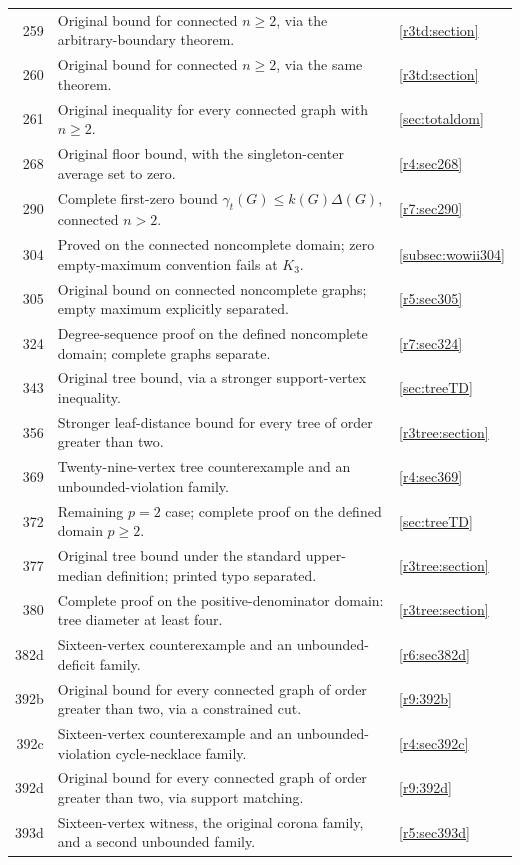 \documentclass[11pt,a4paper]{article}
\theoremstyle{remark}
\begin{document}
\begin{longtable}{@{}r p{10.5cm} l@{}}
259 & Original bound for connected $n\ge2$, via the arbitrary-boundary theorem. & \ref{r3td:section}\\
260 & Original bound for connected $n\ge2$, via the same theorem. & \ref{r3td:section}\\
261 & Original inequality for every connected graph with $n\ge2$. & \ref{sec:totaldom}\\
268 & Original floor bound, with the singleton-center average set to zero. & \ref{r4:sec268}\\
290 & Complete first-zero bound $\gamma_t(G)\le k(G)\Delta(G)$, connected $n>2$. & \ref{r7:sec290}\\
304 & Proved on the connected noncomplete domain; zero empty-maximum convention fails at $K_3$. & \ref{subsec:wowii304}\\
305 & Original bound on connected noncomplete graphs; empty maximum explicitly separated. & \ref{r5:sec305}\\
324 & Degree-sequence proof on the defined noncomplete domain; complete graphs separate. & \ref{r7:sec324}\\
343 & Original tree bound, via a stronger support-vertex inequality. & \ref{sec:treeTD}\\
356 & Stronger leaf-distance bound for every tree of order greater than two. & \ref{r3tree:section}\\
369 & Twenty-nine-vertex tree counterexample and an unbounded-violation family. & \ref{r4:sec369}\\
372 & Remaining $p=2$ case; complete proof on the defined domain $p\ge2$. & \ref{sec:treeTD}\\
377 & Original tree bound under the standard upper-median definition; printed typo separated. & \ref{r3tree:section}\\
380 & Complete proof on the positive-denominator domain: tree diameter at least four. & \ref{r3tree:section}\\
382d & Sixteen-vertex counterexample and an unbounded-deficit family. & \ref{r6:sec382d}\\
392b & Original bound for every connected graph of order greater than two, via a constrained cut. & \ref{r9:392b}\\
392c & Sixteen-vertex counterexample and an unbounded-violation cycle-necklace family. & \ref{r4:sec392c}\\
392d & Original bound for every connected graph of order greater than two, via support matching. & \ref{r9:392d}\\
393d & Sixteen-vertex witness, the original corona family, and a second unbounded family. & \ref{r5:sec393d}\\

\end{longtable}
\end{document}
